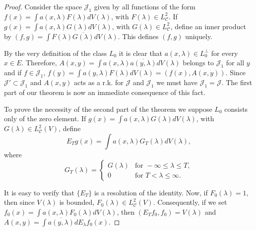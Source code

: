 \documentclass{article}
\begin{document}
\begin{proof}
Consider the space $\mathcal{J}_1$ given by all functions of the form $f(x) = \int a(x, \lambda) F(\lambda) dV(\lambda)$, with $F(\lambda) \in L^2_\mathcal{C}$. If $g(x) = \int a(x, \lambda) G(\lambda) dV(\lambda)$, with $G(\lambda) \in L^2_\mathcal{C}$, define an inner product by $(f, g) = \int F(\lambda) \overline{G(\lambda)} dV(\lambda)$. This defines $(f, g)$ uniquely.

By the very definition of the class $L_0$ it is clear that $a(x, \lambda) \in L_0^{\perp}$ for every $x \in E$. Therefore, $A(x, y) = \int a(x, \lambda) \overline{a(y, \lambda)} dV(\lambda)$ belongs to $\mathcal{J}_1$ for all $y$ and if $f \in \mathcal{J}_1$, $f(y) = \int a(y, \lambda) F(\lambda) dV(\lambda) = (f(x), A(x, y))$. Since $\mathcal{J}' \subset \mathcal{J}_1$ and $A(x, y)$ acts as a r.k. for $\mathcal{J}$ and $\mathcal{J}_1$ we must have $\mathcal{J}_1 = \mathcal{J}$. The first part of our theorem is now an immediate consequence of this fact.

To prove the necessity of the second part of the theorem we suppose $L_0$ consists only of the zero element. If $g(x) = \int a(x, \lambda) G(\lambda) dV(\lambda)$, with $G(\lambda) \in L^2_\mathcal{C}(V)$, define
\begin{equation}
E_T g(x) = \int a(x, \lambda) G_T(\lambda) dV(\lambda),
\label{eq:resolution-definition}
\end{equation}
where
\begin{equation}
G_T(\lambda) = \begin{cases}
G(\lambda) & \text{for } -\infty \leq \lambda \leq T, \\
0 & \text{for } T < \lambda \leq \infty.
\end{cases}
\label{eq:cutoff-function}
\end{equation}

It is easy to verify that $\{E_T\}$ is a resolution of the identity. Now, if $F_0(\lambda) = 1$, then since $V(\lambda)$ is bounded, $F_0(\lambda) \in L^2_\mathcal{C}(V)$. Consequently, if we set $f_0(x) = \int a(x, \lambda) F_0(\lambda) dV(\lambda)$, then $(E_T f_0, f_0) = V(\lambda)$ and $A(x, y) = \int \overline{a(y, \lambda)} dE_\lambda f_0(x)$.


\end{proof}
\end{document}
